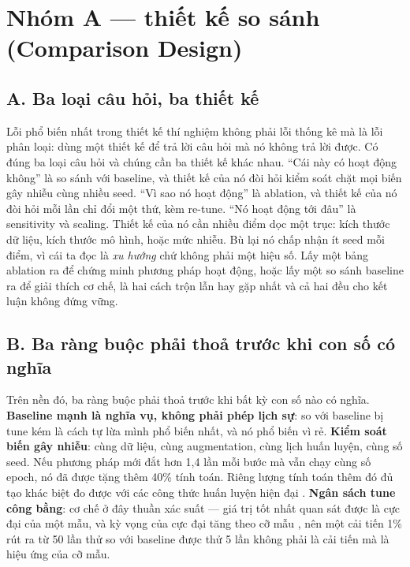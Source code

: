 \documentclass[../../deep_learning.tex]{subfiles}
\begin{document}
\section{Nhóm A --- thiết kế so sánh (Comparison Design)}
\subsection{A. Ba loại câu hỏi, ba thiết kế}
Lỗi phổ biến nhất trong thiết kế thí nghiệm không phải lỗi thống kê mà là lỗi phân loại: dùng một thiết kế để trả lời câu hỏi mà nó không trả lời được. Có đúng ba loại câu hỏi và chúng cần ba thiết kế khác nhau. ``Cái này có hoạt động không'' là so sánh với baseline, và thiết kế của nó đòi hỏi kiểm soát chặt mọi biến gây nhiễu cùng nhiều seed. ``Vì sao nó hoạt động'' là ablation, và thiết kế của nó đòi hỏi mỗi lần chỉ đổi một thứ, kèm re-tune. ``Nó hoạt động tới đâu'' là sensitivity và scaling. Thiết kế của nó cần nhiều điểm dọc một trục: kích thước dữ liệu, kích thước mô hình, hoặc mức nhiễu. Bù lại nó chấp nhận ít seed mỗi điểm, vì cái ta đọc là \emph{xu hướng} chứ không phải một hiệu số. Lấy một bảng ablation ra để chứng minh phương pháp hoạt động, hoặc lấy một so sánh baseline ra để giải thích cơ chế, là hai cách trộn lẫn hay gặp nhất và cả hai đều cho kết luận không đứng vững.

\subsection{B. Ba ràng buộc phải thoả trước khi con số có nghĩa}
Trên nền đó, ba ràng buộc phải thoả trước khi bất kỳ con số nào có nghĩa. \textbf{Baseline mạnh là nghĩa vụ, không phải phép lịch sự}: so với baseline bị tune kém là cách tự lừa mình phổ biến nhất, và nó phổ biến vì rẻ. \textbf{Kiểm soát biến gây nhiễu}: cùng dữ liệu, cùng augmentation, cùng lịch huấn luyện, cùng số seed. Nếu phương pháp mới đắt hơn 1,4 lần mỗi bước mà vẫn chạy cùng số epoch, nó đã được tặng thêm 40\% tính toán. Riêng lượng tính toán thêm đó đủ tạo khác biệt đo được với các công thức huấn luyện hiện đại \cite{goyal2017accurate}. \textbf{Ngân sách tune công bằng}: cơ chế ở đây thuần xác suất — giá trị tốt nhất quan sát được là cực đại của một mẫu, và kỳ vọng của cực đại tăng theo cỡ mẫu \cite{bergstra2012random}, nên một cải tiến 1\% rút ra từ 50 lần thử so với baseline được thử 5 lần không phải là cải tiến mà là hiệu ứng của cỡ mẫu.
\end{document}
